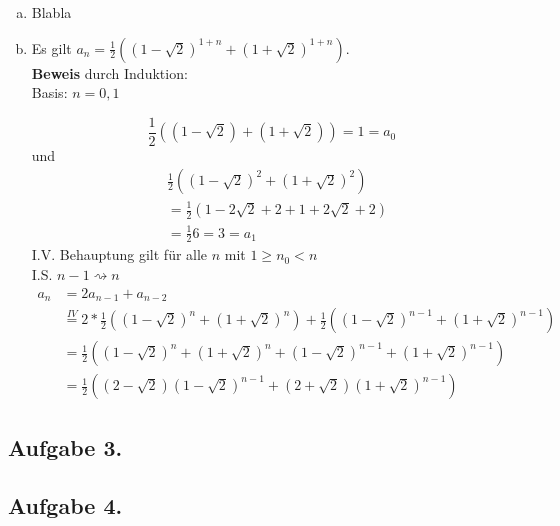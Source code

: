 \documentclass[11pt,a4paper,ngerman]{article}
\begin{document}
\begin{enumerate}[a)]
\item Blabla
\item Es gilt $a_n = \frac{1}{2} \left( \left(1-\sqrt{2} \right)^{1+n}+\left(1+\sqrt{2}\right)^{1+n} \right)$. \\
\textbf{Beweis} durch Induktion: \\
Basis: $n = 0,1$

\begin{equation*}
\frac{1}{2} \left((1-\sqrt{2})+(1+\sqrt{2}) \right) = 1 = a_0
\end{equation*}
und
\begin{equation*}\begin{split}
& \frac{1}{2} \left((1-\sqrt{2})^2+(1+\sqrt{2})^2 \right) \\
& = \frac{1}{2} \left(1-2\sqrt{2}+2+1+2\sqrt{2}+2 \right) \\
& = \frac{1}{2} 6 = 3 = a_1
\end{split}\end{equation*}
I.V. Behauptung gilt für alle $n$ mit $1 \geq n_0 < n$ \\
I.S. $n-1 \rightsquigarrow n$ \\
\begin{equation*}\begin{split}
a_{n} &= 2a_{n-1} + a_{n-2} \\
      &\stackrel{IV}{=} 2* \frac{1}{2} \left( \left(1-\sqrt{2} \right)^{n}+\left(1+\sqrt{2}\right)^{n} \right)
        +  \frac{1}{2} \left( \left(1-\sqrt{2} \right)^{n-1}+\left(1+\sqrt{2}\right)^{n-1} \right) \\
      &= \frac{1}{2} \left(\left(1-\sqrt{2} \right)^{n}+\left(1+\sqrt{2}\right)^{n} + \left(1-\sqrt{2} \right)^{n-1}+\left(1+\sqrt{2}\right)^{n-1} \right) \\
      &= \frac{1}{2} \left(\left(2-\sqrt{2} \right) \left(1-\sqrt{2} \right)^{n-1} + \left(2+\sqrt{2} \right) \left(1+\sqrt{2} \right)^{n-1} \right)
\end{split}\end{equation*}
\end{enumerate}

\subsection*{Aufgabe 3.}


\subsection*{Aufgabe 4.}


\label{LastPage}
\end{document}
